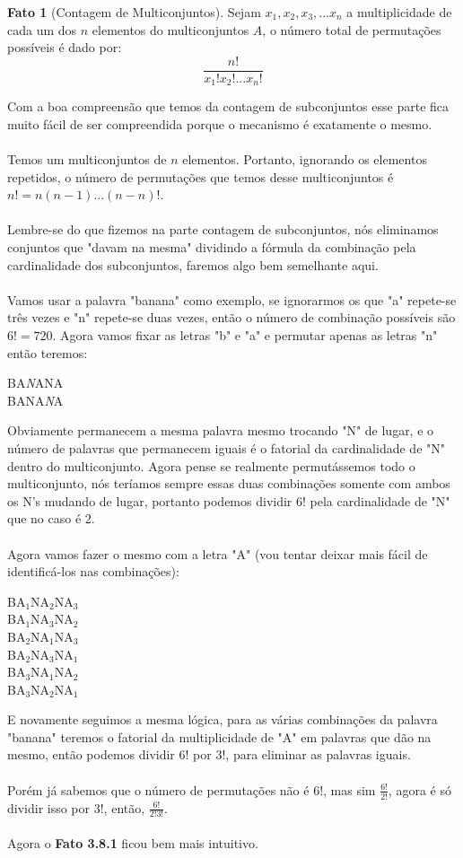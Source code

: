 \documentclass[a4paper,11pt,oneside]{book}
\theoremstyle{definition}
\theoremstyle{break}
\newtheorem{fact}{Fato}[section]
\begin{document}
\begin{fact}[Contagem de Multiconjuntos]
Sejam $x_{1}, x_{2}, x_{3},... x_{n}$ a multiplicidade de cada um dos $n$ elementos do multiconjuntos $A$, o número total de permutações possíveis é dado por:
$$\frac{n!}{x_{1}!x_{2}!...x_{n}!}$$
\end{fact}
Com a boa compreensão que temos da contagem de subconjuntos esse parte fica muito fácil de ser compreendida porque o mecanismo é exatamente o mesmo.
\\
\\
Temos um multiconjuntos de $n$ elementos. Portanto, ignorando os elementos repetidos, o número de permutações que temos desse multiconjuntos é $n! = n(n-1)...(n-n)!$.
\\
\\
Lembre-se do que fizemos na parte contagem de subconjuntos, nós eliminamos conjuntos que "davam na mesma" dividindo a fórmula da combinação pela cardinalidade dos subconjuntos, faremos algo bem semelhante aqui.
\\
\\
Vamos usar a palavra "banana" como exemplo, se ignorarmos os que "a" repete-se três vezes e "n" repete-se duas vezes, então o número de combinação possíveis são $6! = 720$. Agora vamos fixar as letras "b" e "a" e permutar apenas as letras "n" então teremos:
\begin{center}
BA\textit{N}ANA\\
BANA\textit{N}A
\end{center}
Obviamente permanecem a mesma palavra mesmo trocando "N" de lugar, e o número de palavras que permanecem iguais é o fatorial da cardinalidade de "N" dentro do multiconjunto. Agora pense se realmente permutássemos todo o multiconjunto, nós teríamos sempre essas duas combinações somente com ambos os N's mudando de lugar, portanto podemos dividir $6!$ pela cardinalidade de "N" que no caso é $2$.
\\
\\
Agora vamos fazer o mesmo com a letra "A" (vou tentar deixar mais fácil de identificá-los nas combinações):
\begin{center}
BA$_{1}$NA$_{2}$NA$_{3}$ \\
BA$_{1}$NA$_{3}$NA$_{2}$ \\
BA$_{2}$NA$_{1}$NA$_{3}$ \\
BA$_{2}$NA$_{3}$NA$_{1}$ \\
BA$_{3}$NA$_{1}$NA$_{2}$ \\
BA$_{3}$NA$_{2}$NA$_{1}$ \\
\end{center}
E novamente seguimos a mesma lógica, para as várias combinações da palavra "banana" teremos o fatorial da multiplicidade de "A" em palavras que dão na mesmo, então podemos dividir $6!$ por $3!$, para eliminar as palavras iguais.
\\
\\
Porém já sabemos que o número de permutações não é $6!$, mas sim $\frac{6!}{2!}$, agora é só dividir isso por $3!$, então, $\frac{6!}{2!3!}$.
\\
\\
Agora o \textbf{Fato 3.8.1} ficou bem mais intuitivo.
\end{document}
